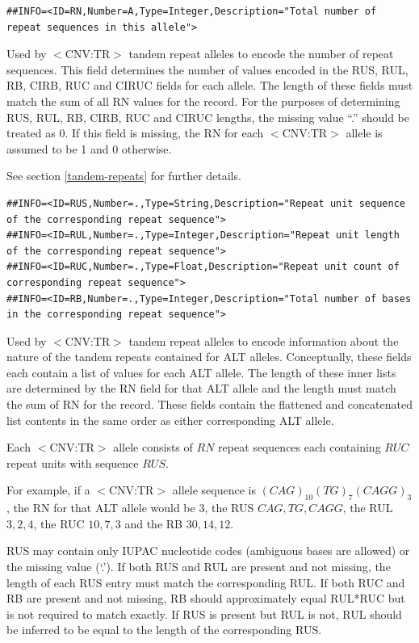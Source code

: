 \documentclass[8pt]{article}
\begin{document}
\footnotesize
\begin{verbatim}
##INFO=<ID=RN,Number=A,Type=Integer,Description="Total number of repeat sequences in this allele">
\end{verbatim}
\normalsize

Used by $<$CNV:TR$>$ tandem repeat alleles to encode the number of repeat sequences.
This field determines the number of values encoded in the RUS, RUL, RB, CIRB, RUC and CIRUC fields for each allele.
The length of these fields must match the sum of all RN values for the record.
For the purposes of determining RUS, RUL, RB, CIRB, RUC and CIRUC lengths, the missing value ``.'' should be treated as 0.
If this field is missing, the RN for each $<$CNV:TR$>$ allele is assumed to be 1 and 0 otherwise.

See section \ref{tandem-repeats} for further details.

\footnotesize
\begin{verbatim}
##INFO=<ID=RUS,Number=.,Type=String,Description="Repeat unit sequence of the corresponding repeat sequence">
##INFO=<ID=RUL,Number=.,Type=Integer,Description="Repeat unit length of the corresponding repeat sequence">
##INFO=<ID=RUC,Number=.,Type=Float,Description="Repeat unit count of corresponding repeat sequence">
##INFO=<ID=RB,Number=.,Type=Integer,Description="Total number of bases in the corresponding repeat sequence">
\end{verbatim}
\normalsize

Used by $<$CNV:TR$>$ tandem repeat alleles to encode information about the nature of the tandem repeats contained for ALT alleles.
Conceptually, these fields each contain a list of values for each ALT allele.
The length of these inner lists are determined by the RN field for that ALT allele and the length must match the sum of RN for the record.
These fields contain the flattened and concatenated list contents in the same order as either corresponding ALT allele.

Each $<$CNV:TR$>$ allele consists of $RN$ repeat sequences each containing $RUC$ repeat units with sequence $RUS$.

For example, if a $<$CNV:TR$>$ allele sequence is $(CAG)_{10}(TG)_{7}(CAGG)_{3}$, the RN for that ALT allele would be 3, the RUS $CAG,TG,CAGG$, the RUL $3,2,4$, the RUC $10,7,3$ and the RB $30,14,12$.

RUS may contain only IUPAC nucleotide codes (ambiguous bases are allowed) or the missing value (`.').
If both RUS and RUL are present and not missing, the length of each RUS entry must match the corresponding RUL.
If both RUC and RB are present and not missing, RB should approximately equal RUL*RUC but is not required to match exactly.
If RUS is present but RUL is not, RUL should be inferred to be equal to the length of the corresponding RUS.
\end{document}
